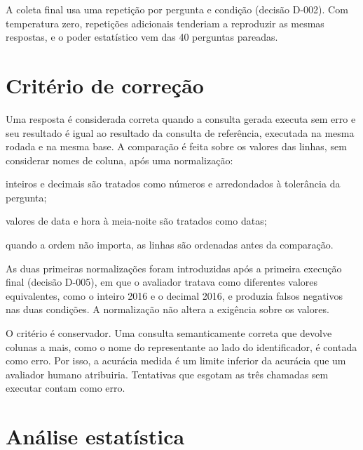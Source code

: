 A coleta final usa uma repetição por pergunta e condição (decisão D-002).
Com temperatura zero, repetições adicionais tenderiam a reproduzir as mesmas
respostas, e o poder estatístico vem das 40 perguntas pareadas.

\section{Critério de correção}
\label{sec:avaliacao}

Uma resposta é considerada correta quando a consulta gerada executa sem
erro e seu resultado é igual ao resultado da consulta de referência,
executada na mesma rodada e na mesma base. A comparação é feita sobre os
valores das linhas, sem considerar nomes de coluna, após uma normalização:
\begin{alineas}
  \item inteiros e decimais são tratados como números e arredondados à
        tolerância da pergunta;
  \item valores de data e hora à meia-noite são tratados como datas;
  \item quando a ordem não importa, as linhas são ordenadas antes da
        comparação.
\end{alineas}

As duas primeiras normalizações foram introduzidas após a primeira execução
final (decisão D-005), em que o avaliador tratava como diferentes valores
equivalentes, como o inteiro 2016 e o decimal 2016, e produzia falsos
negativos nas duas condições. A normalização não altera a exigência sobre
os valores.

O critério é conservador. Uma consulta semanticamente correta que devolve
colunas a mais, como o nome do representante ao lado do identificador,
é contada como erro. Por isso, a acurácia medida é um limite inferior da
acurácia que um avaliador humano atribuiria. Tentativas que esgotam as
três chamadas sem executar contam como erro.

\section{Análise estatística}
\label{sec:analise}


